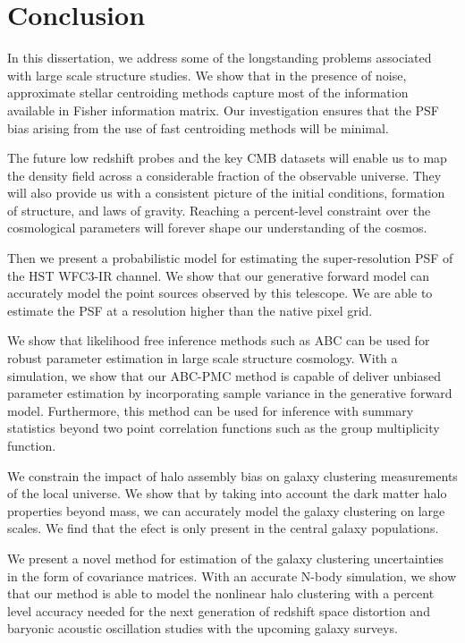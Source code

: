 \chapter*{Conclusion}

In this dissertation, we address some of the longstanding problems associated with large scale structure studies.
We show that in the presence of noise, approximate stellar centroiding methods capture most of the 
information available in Fisher information matrix. Our investigation ensures that the PSF bias arising 
from the use of fast centroiding methods will be minimal. 

The future low redshift probes and the key CMB datasets will enable us to map the 
density field across a considerable fraction of the observable universe. They will also provide us with 
a consistent picture of the initial conditions, formation of structure, and laws of gravity. 
Reaching a percent-level constraint over the cosmological parameters will 
forever shape our understanding of the cosmos. 

Then we present a probabilistic model for estimating the super-resolution PSF of the HST WFC3-IR channel.
We show that our generative forward model can accurately model the point sources observed by this telescope. We are able 
to estimate the PSF at a resolution higher than the native pixel grid.

We show that likelihood free inference methods such as ABC can be used for robust parameter estimation 
in large scale structure cosmology. With a simulation, we show that our ABC-PMC method is capable of deliver unbiased 
parameter estimation by incorporating sample variance in the generative forward model. Furthermore, this method can be used 
for inference with summary statistics beyond two point correlation functions such as the group multiplicity function.

We constrain the impact of halo assembly bias on galaxy clustering measurements of the local universe. 
We show that by taking into account the dark matter halo properties beyond mass, we can accurately model 
the galaxy clustering on large scales. We find that the efect is only present in the central galaxy populations. 

We present a novel method for estimation of the galaxy clustering uncertainties in the form of covariance matrices. 
With an accurate N-body simulation, we show that our method is able to model the nonlinear halo clustering with a 
percent level accuracy needed for the next generation of redshift space distortion and baryonic acoustic oscillation 
studies with the upcoming galaxy surveys.












